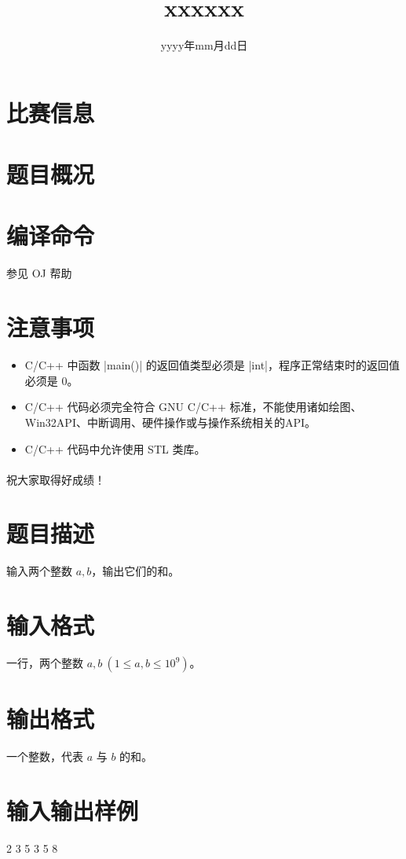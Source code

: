 \documentclass{ctpro}
\title{xxxxxx}
\date{yyyy年mm月dd日}
\begin{document}
\MakeShortVerb{|}

\maketitle
{}

\section*{比赛信息}

\section*{题目概况}
\problemtab

\section*{编译命令}
参见 OJ 帮助

\section*{注意事项}
\begin{itemize}
	\item C/C++ 中函数 |main()| 的返回值类型必须是 |int|，程序正常结束时的返回值必须是 0。
	\item C/C++ 代码必须完全符合 GNU C/C++ 标准，不能使用诸如绘图、Win32API、中断调用、硬件操作或与操作系统相关的API。
	\item C/C++ 代码中允许使用 STL 类库。
\end{itemize}

\paragraph*{} 祝大家取得好成绩！

\makeproblem
\section*{题目描述}
输入两个整数 $a,b$，输出它们的和。

\section*{输入格式}
一行，两个整数 $a,b~(1 \leq a,b \leq 10^9)$。

\section*{输出格式}
一个整数，代表 $a$ 与 $b$ 的和。

\section*{输入输出样例}
\testcasetab
{
	2 3
}
{
	5
}
\testcasetab
{
	3 5
}
{
	8
}
\end{document}
